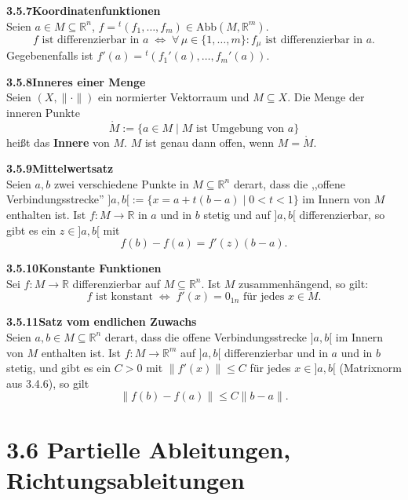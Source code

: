 \documentclass[a4paper,12pt]{article}
\newcommand{\gentry}[3]{%
  \noindent\textbf{#1\quad #2}\nopagebreak\\[0.2em]
  #3\par\smallskip
}
\begin{document}
\gentry{3.5.7}{Koordinatenfunktionen}{%
  Seien $a \in M \subseteq \mathbb{R}^n$, $f = {}^t(f_1, \ldots, f_m) \in \mathrm{Abb}(M, \mathbb{R}^m)$.
  \[
    f \text{ ist differenzierbar in } a \;\Longleftrightarrow\;
    \forall\, \mu \in \{1,\ldots,m\}: f_\mu \text{ ist differenzierbar in } a.
  \]
  Gegebenenfalls ist $f'(a) = {}^t(f_1'(a), \ldots, f_m'(a))$.
}

\gentry{3.5.8}{Inneres einer Menge}{%
  Seien $(X, \|\cdot\|)$ ein normierter Vektorraum und $M \subseteq X$.
  Die Menge der inneren Punkte
  \[
    \mathring M := \{a \in M \mid M \text{ ist Umgebung von } a\}
  \]
  hei{\ss}t das \textbf{Innere} von $M$. $M$ ist genau dann offen, wenn $M = \mathring M$.
}

\gentry{3.5.9}{Mittelwertsatz}{%
  Seien $a, b$ zwei verschiedene Punkte in $M \subseteq \mathbb{R}^n$ derart, dass die
  ,,offene Verbindungsstrecke''
  $]a, b[ := \{x = a + t(b - a) \mid 0 < t < 1\}$ im Innern von $M$ enthalten ist.
  Ist $f : M \to \mathbb{R}$ in $a$ und in $b$ stetig und auf $]a, b[$ differenzierbar,
  so gibt es ein $z \in {]a, b[}$ mit
  \[
    f(b) - f(a) = f'(z)(b - a).
  \]
}

\gentry{3.5.10}{Konstante Funktionen}{%
  Sei $f : M \to \mathbb{R}$ differenzierbar auf $M \subseteq \mathbb{R}^n$. Ist $M$
  zusammenh\"angend, so gilt:
  \[
    f \text{ ist konstant} \;\Longleftrightarrow\; f'(x) = 0_{1n} \text{ f\"ur jedes } x \in M.
  \]
}

\gentry{3.5.11}{Satz vom endlichen Zuwachs}{%
  Seien $a, b \in M \subseteq \mathbb{R}^n$ derart, dass die offene Verbindungsstrecke
  $]a, b[$ im Innern von $M$ enthalten ist. Ist $f : M \to \mathbb{R}^m$ auf $]a, b[$
  differenzierbar und in $a$ und in $b$ stetig, und gibt es ein $C > 0$ mit
  $\|f'(x)\| \leq C$ f\"ur jedes $x \in {]a, b[}$ (Matrixnorm aus 3.4.6), so gilt
  \[
    \|f(b) - f(a)\| \leq C \|b - a\|.
  \]
}

\section*{3.6 \quad Partielle Ableitungen, Richtungsableitungen}
\end{document}
